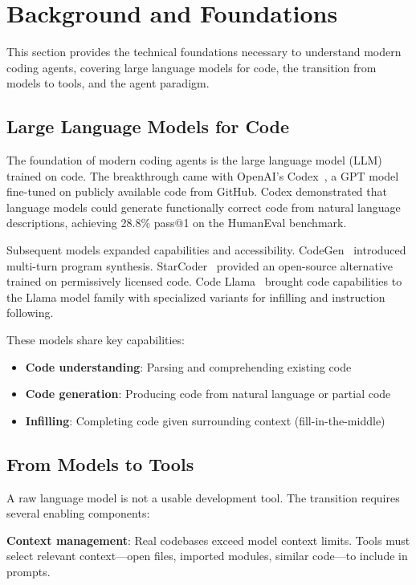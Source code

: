 \section{Background and Foundations}
\label{sec:background}

This section provides the technical foundations necessary to understand modern coding agents, covering large language models for code, the transition from models to tools, and the agent paradigm.

\subsection{Large Language Models for Code}

The foundation of modern coding agents is the large language model (LLM) trained on code. The breakthrough came with OpenAI's Codex~\citep{chen2021codex}, a GPT model fine-tuned on publicly available code from GitHub. Codex demonstrated that language models could generate functionally correct code from natural language descriptions, achieving 28.8\% pass@1 on the HumanEval benchmark.

Subsequent models expanded capabilities and accessibility. CodeGen~\citep{nijkamp2022codegen} introduced multi-turn program synthesis. StarCoder~\citep{li2023starcoder} provided an open-source alternative trained on permissively licensed code. Code Llama~\citep{roziere2023codellama} brought code capabilities to the Llama model family with specialized variants for infilling and instruction following.

These models share key capabilities:
\begin{itemize}
    \item \textbf{Code understanding}: Parsing and comprehending existing code
    \item \textbf{Code generation}: Producing code from natural language or partial code
    \item \textbf{Infilling}: Completing code given surrounding context (fill-in-the-middle)
\end{itemize}

\subsection{From Models to Tools}

A raw language model is not a usable development tool. The transition requires several enabling components:

\textbf{Context management}: Real codebases exceed model context limits. Tools must select relevant context---open files, imported modules, similar code---to include in prompts.

